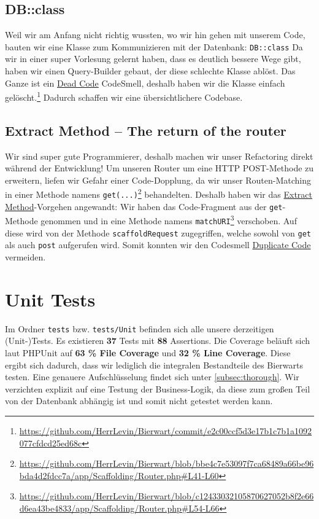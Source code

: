 \documentclass[12pt,a4paper,titlepage,ngerman,pdftex]{report}
\begin{document}
    \subsection{DB::class}\label{subsec:db::class}
    Weil wir am Anfang nicht richtig wussten, wo wir hin gehen mit unserem Code, bauten wir eine Klasse zum Kommunizieren mit der Datenbank: \verb|DB::class|
    Da wir in einer super Vorlesung gelernt haben, dass es deutlich bessere Wege gibt, haben wir einen Query-Builder gebaut, der diese schlechte Klasse ablöst.
    Das Ganze ist ein \href{https://refactoring.guru/smells/dead-code}{Dead Code} CodeSmell, deshalb haben wir die Klasse einfach gelöscht.\footnote{\url{https://github.com/HerrLevin/Bierwart/commit/e2c00ccf5d3e17b1c7b1a1092077cfdcd25ed68c}}
    Dadurch schaffen wir eine übersichtlichere Codebase.
    
    \subsection{Extract Method -- The return of the router}\label{subsec:extract}
    Wir sind super gute Programmierer, deshalb machen wir unser Refactoring direkt während der Entwicklung!
    Um unseren Router um eine HTTP POST-Methode zu erweitern, liefen wir Gefahr einer Code-Dopplung, da wir unser Routen-Matching in einer Methode namens \verb|get(...)|\footnote{\url{https://github.com/HerrLevin/Bierwart/blob/bbe4c7e53097f7ca68489a66be96bda4d2fdcc7a/app/Scaffolding/Router.php\#L41-L60}} behandelten.
    Deshalb haben wir das \href{https://refactoring.guru/extract-method}{Extract Method}-Vorgehen angewandt:
    Wir haben das Code-Fragment aus der \verb|get|-Methode genommen und in eine Methode namens \verb|matchURI|\footnote{\url{https://github.com/HerrLevin/Bierwart/blob/c12433032105870627052b8f2e66d6ea43be4833/app/Scaffolding/Router.php\#L54-L66}} verschoben.
    Auf diese wird von der Methode \verb|scaffoldRequest| zugegriffen, welche sowohl von \verb|get| als auch \verb|post| aufgerufen wird.
    Somit konnten wir den Codesmell \href{https://refactoring.guru/smells/duplicate-code}{Duplicate Code} vermeiden.

    \section{Unit Tests}
    Im Ordner \verb|tests| bzw. \verb|tests/Unit| befinden sich alle unsere derzeitigen (Unit-)Tests.
    Es existieren \textbf{37} Tests mit \textbf{88} Assertions.
    Die Coverage beläuft sich laut PHPUnit auf \textbf{63 \% File Coverage} und \textbf{32 \% Line Coverage}.
    Diese ergibt sich dadurch, dass wir lediglich die integralen Bestandteile des Bierwarts testen.
    Eine genauere Aufschlüsselung findet sich unter \ref{subsec:thorough}.
    Wir verzichten explizit auf eine Testung der Business-Logik, da diese zum großen Teil von der Datenbank abhängig ist und somit nicht getestet werden kann.
\end{document}
